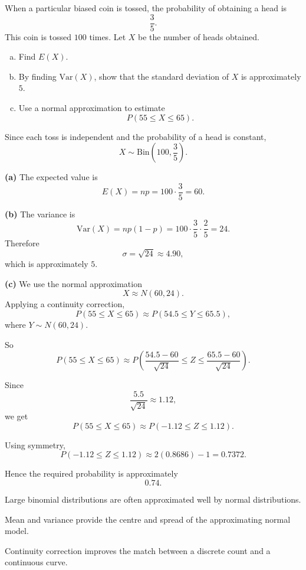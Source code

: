 \begin{problem}
When a particular biased coin is tossed, the probability of obtaining a head is
\[
\frac35.
\]
This coin is tossed $100$ times. Let $X$ be the number of heads obtained.
\begin{enumerate}[(a)]
  \item Find $E(X)$.
  \item By finding $\mathrm{Var}(X)$, show that the standard deviation of $X$ is approximately $5$.
  \item Use a normal approximation to estimate
  \[
  P(55\le X\le 65).
  \]
\end{enumerate}
\end{problem}

\begin{solution}
Since each toss is independent and the probability of a head is constant,
\[
X\sim \mathrm{Bin}\left(100,\frac35\right).
\]

\textbf{(a)} The expected value is
\[
E(X)=np=100\cdot \frac35=60.
\]

\textbf{(b)} The variance is
\[
\mathrm{Var}(X)=np(1-p)=100\cdot \frac35\cdot \frac25=24.
\]
Therefore
\[
\sigma=\sqrt{24}\approx 4.90,
\]
which is approximately $5$.

\textbf{(c)} We use the normal approximation
\[
X \approx N(60,24).
\]
Applying a continuity correction,
\[
P(55\le X\le 65)\approx P(54.5\le Y\le 65.5),
\]
where $Y\sim N(60,24)$.

So
\[
P(55\le X\le 65)\approx
P\left(\frac{54.5-60}{\sqrt{24}}\le Z\le \frac{65.5-60}{\sqrt{24}}\right).
\]

Since
\[
\frac{5.5}{\sqrt{24}}\approx 1.12,
\]
we get
\[
P(55\le X\le 65)\approx P(-1.12\le Z\le 1.12).
\]

Using symmetry,
\[
P(-1.12\le Z\le 1.12)\approx 2(0.8686)-1=0.7372.
\]

Hence the required probability is approximately
\[
\boxed{0.74}.
\]
\end{solution}

\begin{takeaways}
\item Large binomial distributions are often approximated well by normal distributions.
\item Mean and variance provide the centre and spread of the approximating normal model.
\item Continuity correction improves the match between a discrete count and a continuous curve.
\end{takeaways}

